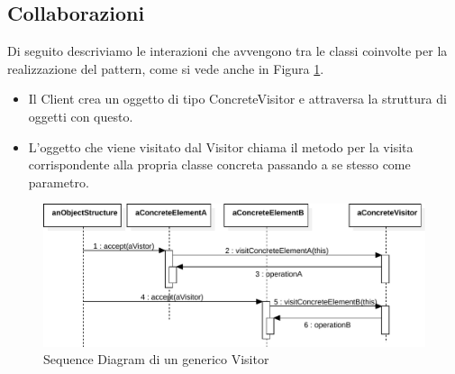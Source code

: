 \subsection{Collaborazioni}
Di seguito descriviamo le interazioni che avvengono tra le classi coinvolte per la realizzazione del pattern, come si vede anche in Figura \ref{fig:visitor-pattern-sequence}.
\begin{itemize}
\item Il Client crea un oggetto di tipo ConcreteVisitor e attraversa la struttura di oggetti con questo.
\item L'oggetto che viene visitato dal Visitor chiama il metodo per la visita corrispondente alla propria classe concreta passando a se stesso come parametro.
\end{itemize}
\begin{figure}[htbp]
\centering
\includegraphics[width=\textwidth,height=\textheight,keepaspectratio]{images/visitor-pattern-sequence.pdf}
\caption{Sequence Diagram di un generico Visitor}
\label{fig:visitor-pattern-sequence}
\end{figure}


